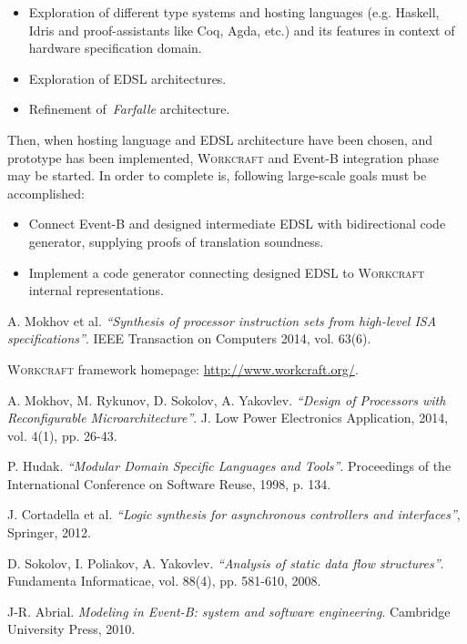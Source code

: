 \documentclass[12pt, a4paper]{article}
\begin{document}
\begin{itemize} 
\item Exploration of different type systems and hosting languages 
(e.g. Haskell, Idris and proof-assistants like Coq, Agda, etc.) and its 
features in context of hardware specification domain.
\item Exploration of EDSL architectures.
\item Refinement of~\emph{Farfalle} architecture.
\end{itemize}

Then, when hosting language and EDSL architecture have been chosen, 
and prototype has been implemented, \textsc{Workcraft} and Event-B integration 
phase may be started. In order to complete is, following large-scale goals
must be accomplished:

\begin{itemize} 
\item Connect Event-B and designed intermediate EDSL with bidirectional code
generator, supplying proofs of translation soundness.
\item Implement a code generator connecting designed EDSL to \textsc{Workcraft}
internal representations.
\end{itemize}

\begin{thebibliography}{7}

A. Mokhov et al.
\emph{``Synthesis of processor instruction sets from high-level ISA specifications''}. IEEE Transaction on Computers 2014, vol. 63(6).

    \textsc{Workcraft} framework homepage: \url{http://www.workcraft.org/}.

  A. Mokhov, M. Rykunov, D. Sokolov, A. Yakovlev.
  \emph{``Design of Processors with Reconfigurable Microarchitecture''}.
  J. Low Power Electronics Application, 2014, vol. 4(1), pp. 26-43.

  P. Hudak.
  \emph{``Modular Domain Specific Languages and Tools''}.
  Proceedings of the International Conference on Software Reuse, 1998, p. 134.

J. Cortadella et al. \emph{``Logic synthesis for asynchronous controllers and interfaces''}, Springer, 2012.

  D. Sokolov, I. Poliakov, A. Yakovlev. \emph{``Analysis of static data flow structures''}. Fundamenta Informaticae, vol. 88(4), pp. 581-610, 2008.

  J-R. Abrial. \emph{Modeling in Event-B: system and software engineering}. Cambridge University Press, 2010.

\end{thebibliography}
\end{document}
